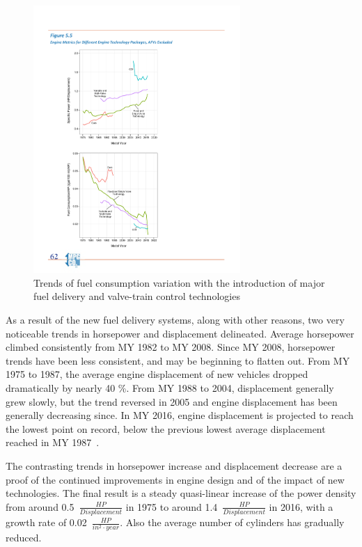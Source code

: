 \begin{figure}[ht]
  \centering
  \includegraphics[width=0.7\textwidth]{figures/review/improvement_valve_fuel_delivery.pdf}
  \caption{Trends of fuel consumption variation with the introduction of major fuel delivery and valve-train control technologies \label{fig:improvement_valve_fuel_delivery} }
\end{figure}

As a result of the new fuel delivery systems, along with other reasons, two very noticeable trends in horsepower and displacement delineated. Average horsepower climbed consistently from MY 1982 to MY 2008. Since MY 2008, horsepower trends have been less consistent, and may be beginning to flatten out. From MY 1975 to 1987, the average engine displacement of new vehicles dropped dramatically by nearly 40 \%. From MY 1988 to 2004, displacement generally grew slowly, but the trend reversed in 2005 and engine displacement has been generally decreasing since. In MY 2016, engine displacement is projected to reach the lowest point on record, below the previous lowest average displacement reached in MY 1987~\cite{EPA2016}.

The contrasting trends in horsepower increase and displacement decrease are a proof of the continued improvements in engine design and of the impact of new technologies. The final result is a steady quasi-linear increase of the power density from around 0.5~$\frac{HP}{Displacement}$ in 1975 to around 1.4~$\frac{HP}{Displacement}$ in 2016, with a growth rate of 0.02~$\frac{HP}{in^{2} \cdot year}$. Also the average number of cylinders has gradually reduced.

